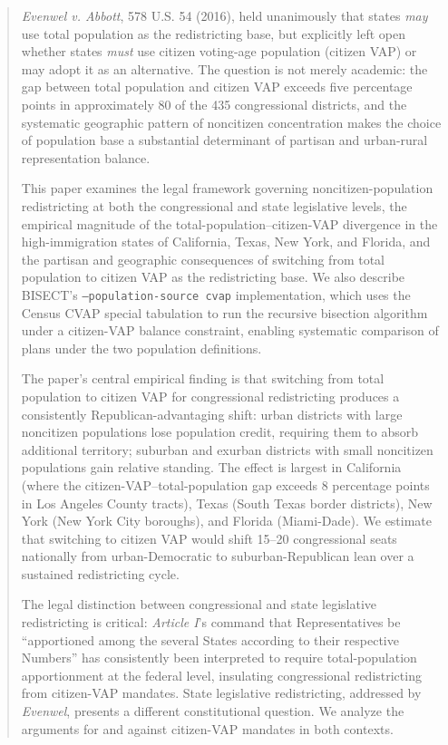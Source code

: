 \begin{abstract}
\emph{Evenwel v. Abbott}, 578 U.S. 54 (2016), held unanimously that states \emph{may} use total population as the redistricting base, but explicitly left open whether states \emph{must} use citizen voting-age population (citizen VAP) or may adopt it as an alternative. The question is not merely academic: the gap between total population and citizen VAP exceeds five percentage points in approximately 80 of the 435 congressional districts, and the systematic geographic pattern of noncitizen concentration makes the choice of population base a substantial determinant of partisan and urban-rural representation balance.

This paper examines the legal framework governing noncitizen-population redistricting at both the congressional and state legislative levels, the empirical magnitude of the total-population--citizen-VAP divergence in the high-immigration states of California, Texas, New York, and Florida, and the partisan and geographic consequences of switching from total population to citizen VAP as the redistricting base. We also describe BISECT's \texttt{--population-source cvap} implementation, which uses the Census CVAP special tabulation to run the recursive bisection algorithm under a citizen-VAP balance constraint, enabling systematic comparison of plans under the two population definitions.

The paper's central empirical finding is that switching from total population to citizen VAP for congressional redistricting produces a consistently Republican-advantaging shift: urban districts with large noncitizen populations lose population credit, requiring them to absorb additional territory; suburban and exurban districts with small noncitizen populations gain relative standing. The effect is largest in California (where the citizen-VAP--total-population gap exceeds 8 percentage points in Los Angeles County tracts), Texas (South Texas border districts), New York (New York City boroughs), and Florida (Miami-Dade). We estimate that switching to citizen VAP would shift 15--20 congressional seats nationally from urban-Democratic to suburban-Republican lean over a sustained redistricting cycle.

The legal distinction between congressional and state legislative redistricting is critical: \emph{Article I}'s command that Representatives be ``apportioned among the several States according to their respective Numbers'' has consistently been interpreted to require total-population apportionment at the federal level, insulating congressional redistricting from citizen-VAP mandates. State legislative redistricting, addressed by \emph{Evenwel}, presents a different constitutional question. We analyze the arguments for and against citizen-VAP mandates in both contexts.
\end{abstract}
